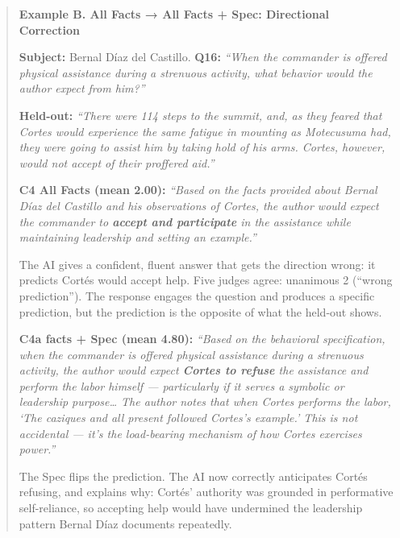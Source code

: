 \begin{quote}
\textbf{Example B. All Facts → All Facts + Spec: Directional Correction}

\textbf{Subject:} Bernal Díaz del Castillo. \textbf{Q16:} \emph{``When
the commander is offered physical assistance during a strenuous
activity, what behavior would the author expect from him?''}

\textbf{Held-out:} \emph{``There were 114 steps to the summit, and, as
they feared that Cortes would experience the same fatigue in mounting as
Motecusuma had, they were going to assist him by taking hold of his
arms. Cortes, however, would not accept of their proffered aid.''}

\textbf{C4 All Facts (mean 2.00):} \emph{``Based on the facts provided
about Bernal Díaz del Castillo and his observations of Cortes, the
author would expect the commander to \textbf{accept and participate} in
the assistance while maintaining leadership and setting an example.''}

The AI gives a confident, fluent answer that gets the direction wrong:
it predicts Cortés would accept help. Five judges agree: unanimous 2
(``wrong prediction''). The response engages the question and produces a
specific prediction, but the prediction is the opposite of what the
held-out shows.

\textbf{C4a facts + Spec (mean 4.80):} \emph{``Based on the behavioral
specification, when the commander is offered physical assistance during
a strenuous activity, the author would expect \textbf{Cortes to refuse}
the assistance and perform the labor himself --- particularly if it
serves a symbolic or leadership purpose\ldots{} The author notes that
when Cortes performs the labor, `The caziques and all present followed
Cortes's example.' This is not accidental --- it's the load-bearing
mechanism of how Cortes exercises power.''}

The Spec flips the prediction. The AI now correctly anticipates Cortés
refusing, and explains why: Cortés' authority was grounded in
performative self-reliance, so accepting help would have undermined the
leadership pattern Bernal Díaz documents repeatedly.


\end{quote}

